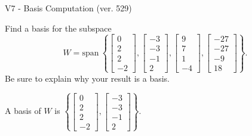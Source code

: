 \begin{exercise}
  \begin{exerciseTitle}V7 - Basis Computation (ver. 529)\end{exerciseTitle}
  \begin{exerciseStatement}
    Find a basis for the subspace 
\[W=\mathrm{span}\ \left\{\left[\begin{array}{r}
0 \\
2 \\
2 \\
-2
\end{array}\right] , \left[\begin{array}{r}
-3 \\
-3 \\
-1 \\
2
\end{array}\right] , \left[\begin{array}{r}
9 \\
7 \\
1 \\
-4
\end{array}\right] , \left[\begin{array}{r}
-27 \\
-27 \\
-9 \\
18
\end{array}\right]\right\}.\]
 Be sure to explain why your result is a basis.


  \end{exerciseStatement}
  \begin{exerciseAnswer}
   A basis of \(W\) is  \(\left\{\left[\begin{array}{r}
0 \\
2 \\
2 \\
-2
\end{array}\right] , \left[\begin{array}{r}
-3 \\
-3 \\
-1 \\
2
\end{array}\right]\right\}\).
  


  \end{exerciseAnswer}
\end{exercise}